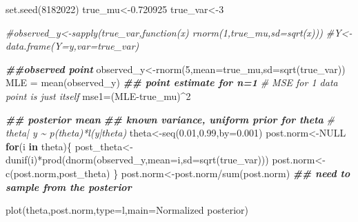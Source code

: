 \documentclass[
]{book}
\newenvironment{Shaded}{\begin{snugshade}}{\end{snugshade}}
\newcommand{\AttributeTok}[1]{\textcolor[rgb]{0.77,0.63,0.00}{#1}}
\newcommand{\CommentTok}[1]{\textcolor[rgb]{0.56,0.35,0.01}{\textit{#1}}}
\newcommand{\ConstantTok}[1]{\textcolor[rgb]{0.00,0.00,0.00}{#1}}
\newcommand{\ControlFlowTok}[1]{\textcolor[rgb]{0.13,0.29,0.53}{\textbf{#1}}}
\newcommand{\DecValTok}[1]{\textcolor[rgb]{0.00,0.00,0.81}{#1}}
\newcommand{\DocumentationTok}[1]{\textcolor[rgb]{0.56,0.35,0.01}{\textbf{\textit{#1}}}}
\newcommand{\FloatTok}[1]{\textcolor[rgb]{0.00,0.00,0.81}{#1}}
\newcommand{\FunctionTok}[1]{\textcolor[rgb]{0.00,0.00,0.00}{#1}}
\newcommand{\NormalTok}[1]{#1}
\newcommand{\OtherTok}[1]{\textcolor[rgb]{0.56,0.35,0.01}{#1}}
\newcommand{\SpecialCharTok}[1]{\textcolor[rgb]{0.00,0.00,0.00}{#1}}
\newcommand{\StringTok}[1]{\textcolor[rgb]{0.31,0.60,0.02}{#1}}
\theoremstyle{definition}
\theoremstyle{definition}
\theoremstyle{definition}
\theoremstyle{definition}
\theoremstyle{remark}
\begin{document}
\begin{Shaded}
\begin{Highlighting}[]
  \FunctionTok{set.seed}\NormalTok{(}\DecValTok{8182022}\NormalTok{)}
\NormalTok{ true\_mu}\OtherTok{\textless{}{-}}\FloatTok{0.720925}
\NormalTok{ true\_var}\OtherTok{\textless{}{-}}\DecValTok{3}
   
 \CommentTok{\#observed\_y\textless{}{-}sapply(true\_var,function(x) rnorm(1,true\_mu,sd=sqrt(x)))}
 \CommentTok{\#Y\textless{}{-}data.frame(Y=y,var=true\_var)}
 
 \DocumentationTok{\#\#observed point}
\NormalTok{ observed\_y}\OtherTok{\textless{}{-}}\FunctionTok{rnorm}\NormalTok{(}\DecValTok{5}\NormalTok{,}\AttributeTok{mean=}\NormalTok{true\_mu,}\AttributeTok{sd=}\FunctionTok{sqrt}\NormalTok{(true\_var)) }
\NormalTok{ MLE }\OtherTok{=} \FunctionTok{mean}\NormalTok{(observed\_y) }\DocumentationTok{\#\# point estimate for n=1}
 \CommentTok{\# MSE for 1 data point is just itself}
\NormalTok{  mse1}\OtherTok{=}\NormalTok{(MLE}\SpecialCharTok{{-}}\NormalTok{true\_mu)}\SpecialCharTok{\^{}}\DecValTok{2}
  
  
  \DocumentationTok{\#\# posterior mean }
  \DocumentationTok{\#\# known variance, uniform prior for theta}
   \CommentTok{\# theta| y \textasciitilde{} p(theta)*l(y|theta)}
\NormalTok{  theta}\OtherTok{\textless{}{-}}\FunctionTok{seq}\NormalTok{(}\FloatTok{0.01}\NormalTok{,}\FloatTok{0.99}\NormalTok{,}\AttributeTok{by=}\FloatTok{0.001}\NormalTok{)}
\NormalTok{  post.norm}\OtherTok{\textless{}{-}}\ConstantTok{NULL}
  \ControlFlowTok{for}\NormalTok{(i }\ControlFlowTok{in}\NormalTok{ theta)\{}
\NormalTok{  post\_theta}\OtherTok{\textless{}{-}}\FunctionTok{dunif}\NormalTok{(i)}\SpecialCharTok{*}\FunctionTok{prod}\NormalTok{(}\FunctionTok{dnorm}\NormalTok{(observed\_y,}\AttributeTok{mean=}\NormalTok{i,}\AttributeTok{sd=}\FunctionTok{sqrt}\NormalTok{(true\_var)))}
\NormalTok{  post.norm}\OtherTok{\textless{}{-}}\FunctionTok{c}\NormalTok{(post.norm,post\_theta)}
\NormalTok{  \}}
\NormalTok{   post.norm}\OtherTok{\textless{}{-}}\NormalTok{post.norm}\SpecialCharTok{/}\FunctionTok{sum}\NormalTok{(post.norm)}
  \DocumentationTok{\#\# need to sample from the posterior}
 
 \FunctionTok{plot}\NormalTok{(theta,post.norm,}\AttributeTok{type=}\StringTok{\textquotesingle{}l\textquotesingle{}}\NormalTok{,}\AttributeTok{main=}\StringTok{\textquotesingle{}Normalized posterior\textquotesingle{}}\NormalTok{)}
\end{Highlighting}
\end{Shaded}
\end{document}
